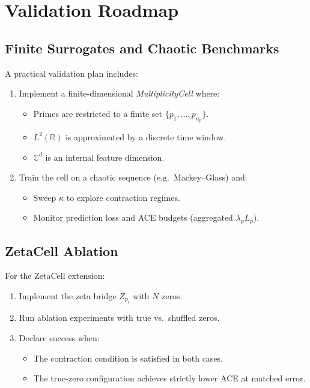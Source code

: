 \documentclass[11pt]{article}
\begin{document}
\section{Validation Roadmap}

\subsection{Finite Surrogates and Chaotic Benchmarks}

A practical validation plan includes:

\begin{enumerate}[leftmargin=1.5em]
  \item Implement a finite-dimensional \emph{MultiplicityCell} where:
    \begin{itemize}
      \item Primes are restricted to a finite set $\{p_1,\dots,p_{n_p}\}$.
      \item $L^2(\mathbb{R})$ is approximated by a discrete time window.
      \item $\mathbb{C}^d$ is an internal feature dimension.
    \end{itemize}
  \item Train the cell on a chaotic sequence (e.g.\ Mackey--Glass) and:
    \begin{itemize}
      \item Sweep $\kappa$ to explore contraction regimes.
      \item Monitor prediction loss and ACE budgets (aggregated $\lambda_p L_p$).
    \end{itemize}
\end{enumerate}

\subsection{ZetaCell Ablation}

For the ZetaCell extension:
\begin{enumerate}[leftmargin=1.5em]
  \item Implement the zeta bridge $Z_{p_i}$ with $N$ zeros.
  \item Run ablation experiments with true vs.\ shuffled zeros.
  \item Declare success when:
    \begin{itemize}
      \item The contraction condition is satisfied in both cases.
      \item The true-zero configuration achieves strictly lower ACE at matched error.
    \end{itemize}
\end{enumerate}
\end{document}
